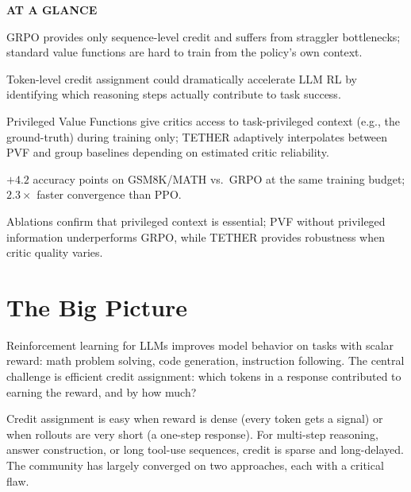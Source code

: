 \documentclass[10pt,twocolumn]{article}
\begin{document}
\begin{mdframed}[backgroundcolor=boxgray,linecolor=rulered,linewidth=1pt,
    innerleftmargin=6pt,innerrightmargin=6pt,
    innertopmargin=6pt,innerbottommargin=6pt]
\textbf{\small AT A GLANCE}\par\vspace{4pt}
\begin{description}[leftmargin=0pt,labelsep=4pt,itemsep=2pt,parsep=0pt,
    font=\small\bfseries]
  \item[Problem:] GRPO provides only sequence-level credit and suffers
    from straggler bottlenecks; standard value functions are hard to
    train from the policy's own context.
  \item[Why it matters:] Token-level credit assignment could dramatically
    accelerate LLM RL by identifying which reasoning steps actually
    contribute to task success.
  \item[Method:] Privileged Value Functions give critics access to
    task-privileged context (e.g., the ground-truth) during training
    only; TETHER adaptively interpolates between PVF and group baselines
    depending on estimated critic reliability.
  \item[Result:] $+4.2$ accuracy points on GSM8K/MATH vs.\ GRPO at the
    same training budget; $2.3\times$ faster convergence than PPO.
  \item[Evidence:] Ablations confirm that privileged context is essential;
    PVF without privileged information underperforms GRPO, while TETHER
    provides robustness when critic quality varies.
\end{description}
\end{mdframed}

\section{The Big Picture}

Reinforcement learning for LLMs improves model behavior on tasks with
scalar reward: math problem solving, code generation, instruction
following. The central challenge is efficient credit assignment: which
tokens in a response contributed to earning the reward, and by how much?

Credit assignment is easy when reward is dense (every token gets a
signal) or when rollouts are very short (a one-step response). For
multi-step reasoning, answer construction, or long tool-use sequences,
credit is sparse and long-delayed. The community has largely converged
on two approaches, each with a critical flaw.
\end{document}
